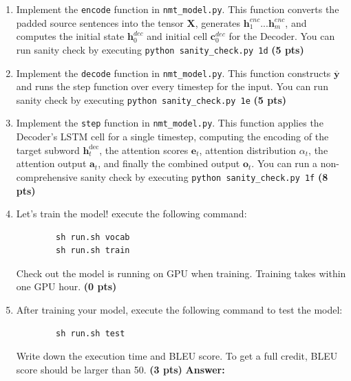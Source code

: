 \documentclass{assignment format}
\newcommand{\hdec}{\mathbf{h}^{\text{dec}}}
\newenvironment{answer}{
    {\bf Answer:} \begingroup\color{red}
}{\endgroup}%
\begin{document}
\begin{enumerate}[label=(\alph*)]
    \item Implement the \texttt{encode} function in \texttt{nmt\_model.py}. This function converts the padded source sentences into the tensor $\mathbf{X}$, generates $\mathbf{h}^{enc}_1$...$\mathbf{h}^{enc}_m$, and computes the initial state $\mathbf{h}^{dec}_0$ and initial cell $\mathbf{c}^{dec}_0$ for the Decoder. You can run sanity check by executing \texttt{python sanity\_check.py 1d} \textbf{(5 pts)}
    \item Implement the \texttt{decode} function in \texttt{nmt\_model.py}. This function constructs $\overline{\mathbf{y}}$ 
    and runs the step function over every timestep for the input. You can run sanity check by executing \texttt{python sanity\_check.py 1e} \textbf{(5 pts)}
    \item Implement the \texttt{step} function in \texttt{nmt\_model.py}. This function applies the Decoder's LSTM cell for a single timestep, computing the encoding of the target subword $\hdec_t$, the attention scores $\mathbf{e}_t$, attention distribution $\alpha_t$, the attention output $\mathbf{a}_{t}$, and finally the combined output $\mathbf{o}_t$. You can run a non-comprehensive sanity check by executing \texttt{python sanity\_check.py 1f}  \textbf{(8 pts)}
    \item Let's train the model! execute the following command:
    \begin{verbatim}
        sh run.sh vocab
        sh run.sh train
    \end{verbatim}
    Check out the model is running on GPU when training. Training takes within one GPU hour. \textbf{(0 pts)}
        \item After training your model, execute the following command to test the model:
    \begin{verbatim}
        sh run.sh test
    \end{verbatim}
        Write down the execution time and BLEU score. To get a full credit, BLEU score should be larger than 50. \textbf{(3 pts)}
        \begin{answer} 
        \end{answer}  
        

\end{enumerate}
\end{document}
